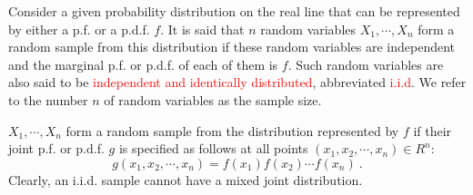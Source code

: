 \documentclass[12pt,a4paper]{article}
\begin{document}
Consider a given probability distribution on the real line that can be represented by either a p.f. or a p.d.f. $f$. It is said that $n$ random variables $X_1, \cdots, X_n$ form a random sample from this distribution if these random variables are independent and the marginal p.f. or p.d.f. of each of them is $f$. Such random variables are also said to be \textcolor{red}{independent and identically distributed}, abbreviated \textcolor{red}{i.i.d}. We refer to the number $n$ of random variables as the sample size.

$X_1, \cdots, X_n$ form a random sample from the distribution represented by $f$ if their joint p.f. or p.d.f. $g$ is specified as follows at all points $(x_1, x_2, \cdots, x_n) \in R^n$:
\begin{equation*}
g(x_1, x_2, \cdots, x_n) = f(x_1)f(x_2) \cdots f(x_n) ~.
\end{equation*}
Clearly, an i.i.d. sample cannot have a mixed joint distribution.

































































































\end{document}
